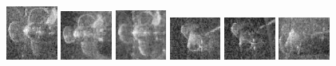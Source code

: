 \begin{figure}
    \includegraphics[width=0.15\textwidth]{chapters/images/dataset/all-class-images/propeler/propeler-58.jpg}
    \includegraphics[width=0.15\textwidth]{chapters/images/dataset/all-class-images/propeler/propeler-76.jpg}
    \includegraphics[width=0.15\textwidth]{chapters/images/dataset/all-class-images/propeler/propeler-45.jpg}
    \includegraphics[width=0.15\textwidth]{chapters/images/dataset/all-class-images/propeler/propeler-127.jpg}
    \includegraphics[width=0.15\textwidth]{chapters/images/dataset/all-class-images/propeler/propeler-136.jpg}
    \includegraphics[width=0.15\textwidth]{chapters/images/dataset/all-class-images/propeler/propeler-109.jpg}
    

\end{figure}
